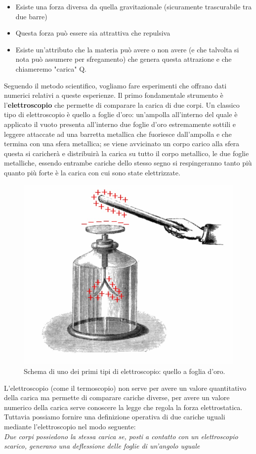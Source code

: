 \documentclass[
10pt, %
a4paper, %
oneside, %
headinclude,footinclude, %
BCOR5mm, %
]{scrartcl}
\begin{document}
\begin{itemize}
	\item Esiste una forza diversa da quella gravitazionale (sicuramente trascurabile tra due barre)
	\item Questa forza può essere sia attrattiva che repulsiva
	\item Esiste un'attributo che la materia può avere o non avere (e che talvolta si nota può assumere per sfregamento) che genera questa attrazione e che chiameremo "carica" Q.
\end{itemize}
Seguendo il metodo scientifico, vogliamo fare esperimenti che offrano dati numerici relativi a queste esperienze. Il primo fondamentale strumento è l'\textbf{elettroscopio} che permette di comparare la carica di due corpi. Un classico tipo di elettroscopio è quello a foglie d'oro: un'ampolla all'interno del quale è applicato il vuoto presenta all'interno due foglie d'oro estremamente sottili e leggere attaccate ad una barretta metallica che fuoriesce dall'ampolla e che termina con una sfera metallica; se viene avvicinato un corpo carico alla sfera questa si caricherà e distribuirà la carica su tutto il corpo metallico, le due foglie metalliche, essendo entrambe cariche dello stesso segno si respingeranno tanto più quanto più forte è la carica con cui sono state elettrizzate.
\begin{figure}[h!]
	\centering
	\includegraphics[width=0.4\linewidth]{../images/elettroscopio}
	\caption{Schema di uno dei primi tipi di elettroscopio: quello a foglia d'oro.}
	\label{fig:elettroscopio}
\end{figure}
\FloatBarrier
L'elettroscopio (come il termoscopio) non serve per avere un valore quantitativo della carica ma permette di comparare cariche diverse, per avere un valore numerico della carica serve conoscere la legge che regola la forza elettrostatica. Tuttavia possiamo fornire una definizione operativa di due cariche uguali mediante l'elettroscopio nel modo seguente:\\
\textit{Due corpi possiedono la stessa carica se, posti a contatto con un elettroscopio scarico, generano una deflessione delle foglie di un'angolo uguale}\\
\end{document}
